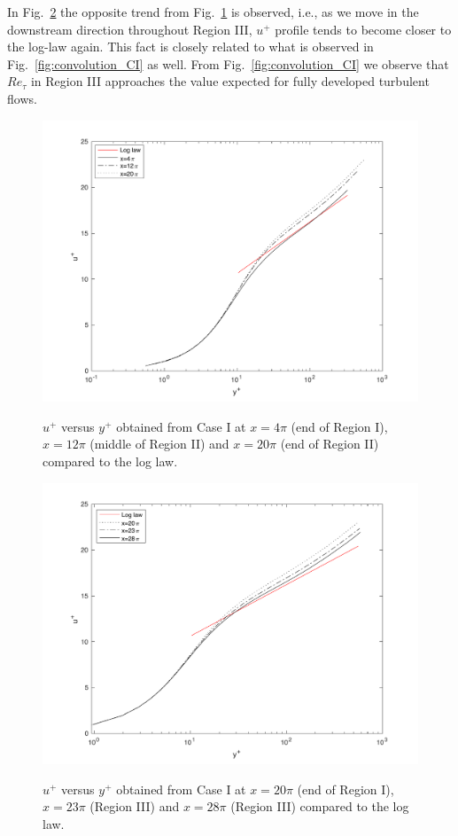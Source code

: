 \documentclass[twocolumn,10pt]{asme2e}
\begin{document}
In Fig.~\ref{fig:log_law_CI_downstream} the opposite trend from Fig.~\ref{fig:log_law_CI_upstream} is observed, i.e., as we move in the downstream direction throughout Region III, \(u^+\) profile tends to become closer to the log-law again. This fact is closely related to what is observed in Fig.~\ref{fig:convolution_CI} as well. From Fig.~\ref{fig:convolution_CI} we observe that \(Re_{\tau}\) in Region III approaches the value expected for fully developed turbulent flows.

\begin{figure}[t]
\centering
\scalebox{0.5}
{\includegraphics{log_law_CI_upstream.pdf}}
\caption{\(u^+\) versus \(y^+\) obtained from Case I at \(x=4{\pi}\) (end of Region I), \(x=12{\pi}\) (middle of Region II) and \(x=20{\pi}\) (end of Region II) compared to the log law.}
\label{fig:log_law_CI_upstream}
\end{figure}

\begin{figure}[t]
\centering
\scalebox{0.5}
{\includegraphics{log_law_CI_downstream.pdf}}
\caption{\(u^+\) versus \(y^+\) obtained from Case I at \(x=20{\pi}\) (end of Region I), \(x=23{\pi}\) (Region III) and \(x=28{\pi}\) (Region III) compared to the log law.}
\label{fig:log_law_CI_downstream}
\end{figure}
\end{document}
